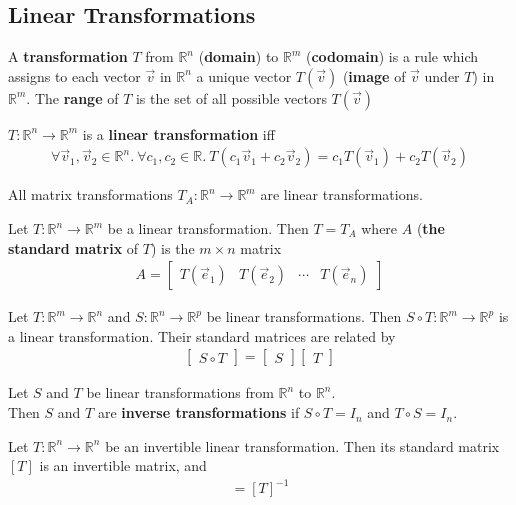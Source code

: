 \documentclass{article}
\begin{document}
\subsection{Linear Transformations}
\begin{definition}
	A \textbf{transformation} $T$ from $\mathbb{R}^n$ (\textbf{domain}) to $\mathbb{R}^m$ (\textbf{codomain}) is a rule which assigns to each vector $\vec v$ in $\mathbb{R}^n$ a unique vector $T(\vec v)$ (\textbf{image} of $\vec v$ under $T$) in $\mathbb{R}^m$.
	The \textbf{range} of $T$ is the set of all possible vectors $T(\vec v)$
\end{definition}
\begin{definition}
	$T:\mathbb{R}^n \to \mathbb{R}^m$ is a \textbf{linear transformation} iff
	\begin{align*}
		\forall \vec v_1, \vec v_2 \in \mathbb{R}^n.\:\forall c_1, c_2 \in \mathbb{R}.\: T(c_1\vec v_1 + c_2\vec v_2) = c_1T(\vec v_1) + c_2T(\vec v_2)
	\end{align*}
\end{definition}
\begin{theorem}
	All matrix transformations $T_A:\mathbb{R}^n\to\mathbb{R}^m$ are linear transformations.
\end{theorem}
\begin{theorem}
	Let $T:\mathbb{R}^n\to\mathbb{R}^m$ be a linear transformation. Then $T=T_A$ where $A$ (\textbf{the standard matrix} of $T$) is the $m\times n$ matrix
	\begin{align*}
		A = \begin{bmatrix}
			    T(\vec e_1) & T(\vec e_2) & \cdots & T(\vec e_n)
		    \end{bmatrix}
	\end{align*}
\end{theorem}
\begin{theorem}
	Let $T:\mathbb{R}^m\to\mathbb{R}^n$ and $S:\mathbb{R}^n\to\mathbb{R}^p$ be linear transformations. Then $S\circ T:\mathbb{R}^m\to\mathbb{R}^p$ is a linear transformation. Their standard matrices are related by
	\begin{align*}
		\begin{bmatrix}
			S\circ T
		\end{bmatrix}
		= \begin{bmatrix}
			  S
		  \end{bmatrix}
		\begin{bmatrix}
			T
		\end{bmatrix}
	\end{align*}
\end{theorem}
\begin{definition}
	Let $S$ and $T$ be linear transformations from $\mathbb{R}^n$ to $\mathbb{R}^n$.\\
	Then $S$ and $T$ are \textbf{inverse transformations} if $S\circ T= I_n$ and $T\circ S=I_n$.
\end{definition}
\begin{theorem}
	Let $T:\mathbb{R}^n\to\mathbb{R}^n$ be an invertible linear transformation. Then its standard matrix $[T]$ is an invertible matrix, and
	\begin{gather*}
		[T^{-1}] = [T]^{-1}
	\end{gather*}
\end{theorem}
\end{document}
